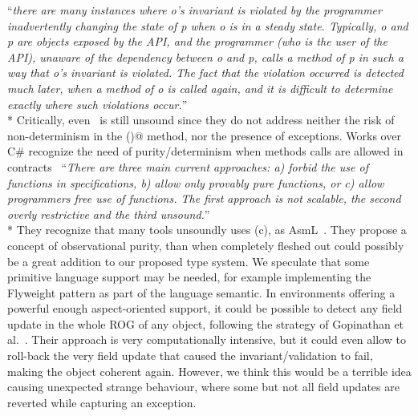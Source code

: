 ``\emph{there are many instances where o's invariant is violated by the programmer inadvertently changing the state
of p when o is in a steady state. Typically, o and p
are objects exposed by the API, and the programmer (who is the user of the API), unaware of
the dependency between o and p, calls a method of p in such a way that
o's invariant is violated. The fact that the violation occurred is detected
much later, when a method of o is called again, and it is difficult to 
determine exactly where such violations occur.}''\\*
Critically, even~\cite{Gopinathan:2008:RMO:1483018.1483028} is still unsound since they do not address neither
the risk of non-determinism in the \Q@invariant()@ method, 
nor the presence of exceptions.
\sepItems
Works over C\# recognize the need
of purity/determinism when methods calls are allowed in contracts~\cite{barnett200499}
``\emph{There are three main current approaches: a) forbid the use of functions in specifications, b) allow only provably pure functions, or c) allow programmers free use
of functions. The first approach is not scalable, the second overly restrictive and
the third unsound.}''\\*
They recognize that many tools unsoundly uses (c), as AsmL~\cite{barnett2003runtime}.
They propose a concept of observational purity, than when completely fleshed out
could possibly be a great addition to our proposed type system.
We speculate that some 
primitive language support may be needed, for example implementing the Flyweight pattern 
as part of the language semantic.
\sepItems
In environments offering a powerful enough aspect-oriented support,
it could be possible to detect any field update in the whole ROG of
any object, following the strategy of 
Gopinathan et al.~\cite{Gopinathan:2008:RMO:1483018.1483028}.
Their approach is very computationally intensive, but it could even allow to roll-back the very field update that caused 
the invariant/validation to fail, making the object coherent again.
However, we think this would be a terrible idea causing unexpected strange behaviour, where some but not all
field updates are reverted while capturing an exception.



